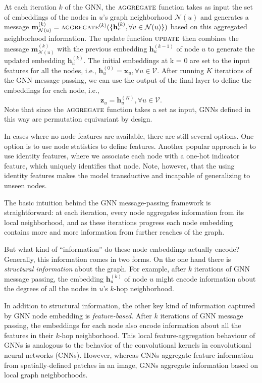 \documentclass[10pt]{book}
\let\defaultmarginpar\marginpar
\renewcommand\marginpar[2][]{\defaultmarginpar{\itshape\color{gray}#2}}
\begin{document}
At each iteration $k$ of the GNN, the $\textsc{aggregate}$ function takes as input the set of embeddings of the nodes in $u$'s graph neighborhood $\mathcal N(u)$ and generates a message $\mathbf m^{(k)}_{\mathcal N(u)} = \textsc{aggregate}^{(k)}(\{\mathbf h^{(k)}_v, \forall v \in \mathcal N(u)\})$ based on this aggregated neighborhood information. The update function $\textsc{update}$ then combines the message $\mathbf m^{(k)}_{\mathcal N(u)}$ with the previous embedding $\mathbf h^{(k−1)}_u$ of node $u$ to generate the updated embedding $\mathbf h^{(k)}_u$. The initial embeddings at k = 0 are set to the input features for all the nodes, i.e., $\mathbf h^{(0)}_u = \mathbf x_u, \forall u \in \mathcal V$. After running $K$ iterations of the GNN message passing, we can use the output of the final layer to define the embeddings for each node, i.e.,
\begin{equation}
    \mathbf z_u = \mathbf h^{(K)}_u, \forall u \in \mathcal V.
\end{equation}
Note that since the $\textsc{aggregate}$ function takes a set as input, GNNs defined in this way are permutation equivariant by design.

In cases where no node features are available, there are still several options. One option is to use node statistics to define
features. Another popular approach is to use identity features, where we associate each node with a one-hot indicator feature, which uniquely identifies that node. Note, however, that the using identity features makes the model transductive and incapable of generalizing to unseen nodes.

The basic intuition behind the GNN message-passing framework is straightforward: at each iteration, every node aggregates information from its local neighborhood, and as these iterations progress each node embedding contains more and more information from further reaches of the graph.

But what kind of ``information'' do these node embeddings actually encode? Generally, this information comes in two forms. On the one hand there is \emph{structural information}\marginpar{structural information} about the graph. For example, after $k$ iterations of GNN message passing, the embedding $\mathbf h^{(k)}_u$ of node $u$ might encode information about
the degrees of all the nodes in $u$'s $k$-hop neighborhood.

In addition to structural information, the other key kind of information captured by GNN node embedding is \emph{feature-based}\marginpar{feature-based}. After $k$ iterations of GNN message passing, the embeddings for each node also encode information about all the features in their $k$-hop neighborhood. This local feature-aggregation behaviour of GNNs is analogous to the behavior of the convolutional kernels in convolutional neural networks (CNNs). However, whereas CNNs aggregate
feature information from spatially-defined patches in an image, GNNs aggregate information based on local graph neighborhoods.
\end{document}
